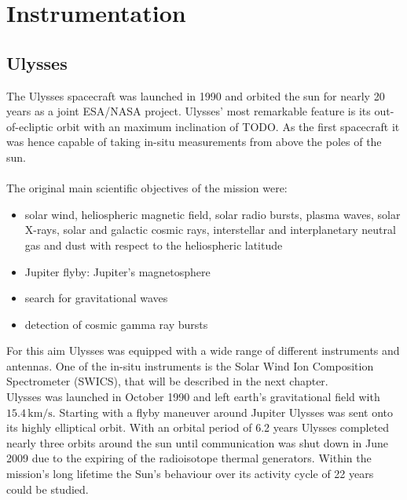
\chapter{Instrumentation} %

\label{ChapterInstrumentation} 



\section{Ulysses}
\label{sec:ulysses}
The Ulysses spacecraft was launched in 1990 and orbited the sun for nearly 20 years as a joint ESA/NASA project.
Ulysses' most remarkable feature is its out-of-ecliptic orbit with an maximum inclination of TODO.
As the first spacecraft it was hence capable of taking in-situ measurements from above the poles of the sun.
\\ \\
The original main scientific objectives of the mission were:
\begin{itemize}
	\item solar wind, heliospheric magnetic field, solar radio bursts, plasma waves, solar X-rays, solar and galactic cosmic rays, interstellar and interplanetary neutral gas and dust with respect to the heliospheric latitude
	\item Jupiter flyby: Jupiter's magnetosphere
	\item search for gravitational waves
	\item detection of cosmic gamma ray bursts
\end{itemize}
For this aim Ulysses was equipped with a wide range of different instruments and antennas. One of the in-situ instruments is the Solar Wind Ion Composition Spectrometer (SWICS), that will be described in the next chapter.\\
Ulysses was launched in October 1990 and left earth's gravitational field with $15.4\,\mathrm{km/s}$. Starting with a flyby maneuver around Jupiter Ulysses was sent onto its highly elliptical orbit.
With an orbital period of 6.2 years Ulysses completed nearly three orbits around the sun until communication was shut down in June 2009 due to the expiring of the radioisotope thermal generators.
Within the mission's long lifetime the Sun's behaviour over its activity cycle of 22 years could be studied. 
